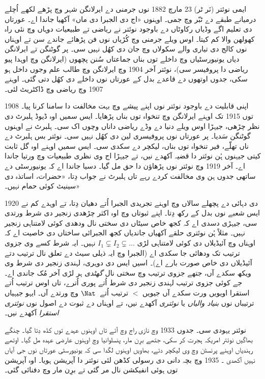 \documentclass[../../../include/open-logic-section]{subfiles}
\begin{document}



ایمی نوئتر (\textsc{نَر} ٹر) 23 مارچ 1882 نوں جرمنی دے ایرلانگن شہر وچ پڑھے لکھے اُچلے درمیانے طبقے دے ٹبّر وچ جمی۔ اوہنوں «اج دی الجبرا دی ماں» آکھیا جاندا اے۔ عورتاں دی تعلیم اگے وڈیاں رکاوٹاں دے باوجود نوئتر نے ریاضی تے طبیعیات دوہاں وچ نئی راہ کھولھن والا کم کیتا۔ اوس ویلے جرمنی وچ کُڑیاں نوں فن پڑھائے جاندے سن تے اوہناں نوں کالج دی تیاری والے سکولاں وچ جان دی کھُل نہیں سی۔ پر گوٹنگن تے ایرلانگن دیاں یونیورسٹیاں وچ داخلے توں بناں جماعتاں سُنن پچھوں (ایرلانگن وچ اوہدا پیو ریاضی دا پروفیسر سی)، نوئتر آخر 1904 وچ ایرلانگن وچ طالب علم وجوں داخل ہو سکی، جدوں اوتھوں دے قاعدے بدل کے عورتاں نوں داخلے دی کھُل دتی گئی۔ اوہنے 1907 وچ ریاضی وچ ڈاکٹریٹ لئی۔

اپنی قابلیت دے باوجود نوئتر نوں اپنے پیشے وچ بہت مخالفت دا سامنا کرنا پیا۔ 1908 توں 1915 تک اوہنے ایرلانگن وچ تنخواہ توں بناں پڑھایا۔ ایس سمیں اوہ ڈیوڈ ہلبرٹ دی نظر چڑھی، جیہڑا اوس ویلے دنیا دے وڈے ریاضی داناں وچوں اک سی۔ ہلبرٹ نے اوہنوں گوٹنگن سَدیا۔ پر عورتاں نوں پروفیسری لین دی کھُل نہیں سی۔ نوئتر بس ہلبرٹ دے ناں تھلّے، فیر تنخواہ توں بناں، لیکچر دے سکدی سی۔ ایس سمیں اوہنے اوہ گل ثابت کیتی جیہنوں ہُن نوئتر دا قضیہ آکھدے نیں، تے جیہڑا اج وی نظری طبیعیات وچ ورتیا جاندا اے۔ آخر 1919 وچ نوئتر نوں پڑھاؤن دا حق مل گیا۔ دسیا جاندا اے کہ یونیورسٹی دے ساتھی جدوں ہن وی مخالفت کردے رہے تاں ہلبرٹ نے جواب دِتا، «حضرات، اساتذہ دی سینیٹ کوئی حمام نہیں۔»

1920 دی دہائی دے پچھلے سالاں وچ اوہنے تجریدی الجبرا اُتے دھیان دِتا، تے اوہدے کم نے ایس شعبے نوں بدل کے رکھ دِتا۔ اپنے ثبوتاں وچ اوہ اکثر چڑھدی زنجیر دی شرط ورتدی سی، جیہڑی دسدی اے کہ کجھ خاص سیٹاں دی سختی نال ودھدی کوئی لامتناہی زنجیر نہیں۔ مثلاً ہُن نوئتری حلقے آکھیاں جاندیاں کجھ الجبرائی ساختاں دی خاصیت اے کہ اوہناں وچ آئیڈیلاں دی کوئی لامتناہی لڑی $I_1
\subsetneq I_2 \subsetneq \dots$ نہیں۔ ایہ شرط کسے وی جزوی ترتیب تک ودھائی جا سکدی اے (الجبرا وچ ایہ ذیلی سیٹ دے تعلق نال ترتیب دتے آئیڈیلاں دی خاص صورت بارے اے)۔ اسیں ایس دی دوہری، لہندی زنجیر دی شرط وی ویکھ سکدے آں، جتھے جزوی ترتیب وچ سختی نال \emph{گھٹدی} ہر لڑی آخر مُک جاندی اے۔ جے کوئی جزوی ترتیب لہندی زنجیر دی شرط اُتے پوری اُترے، تاں اوس ترتیب اُتے استقرا اویویں ورت سکدے آں جیویں $<$ ترتیب اُتے~$\Nat$ وچ ورتدے آں۔ ایہو جیہیاں ترتیباں نوں \emph{بنیاد والیاں} یا \emph{نوئتری} آکھدے نیں، تے اوہناں دے ثبوت دے اصول نوں \emph{نوئتری استقرا} آکھدے نیں۔

نوئتر یہودی سی۔ جدوں 1933 وچ نازی راج وچ آئے تاں اوہنوں عہدے توں کڈھ دِتا گیا۔ چنگے بھاگیں نوئتر امریکہ ہجرت کر سکی، جتھے برِن مار، پنسلوانیا وچ اوہنوں عارضی عہدہ مل گیا۔ اوتھے رہندیاں اوہنے پرنسٹن وچ وی لیکچر دتے، بھاویں اوہنوں لگدا سی کہ یونیورسٹی عورتاں نوں جی آیاں نہیں آکھدی \citep[81]{Dick1981}۔ 1935 وچ بچہ دانی دی رسولی کڈھن لئی نوئتر دا آپریشن ہویا۔ اوہ آپریشن توں ہوئی انفیکشن نال مر گئی تے برِن مار وچ دفنائی گئی۔
\end{document}
